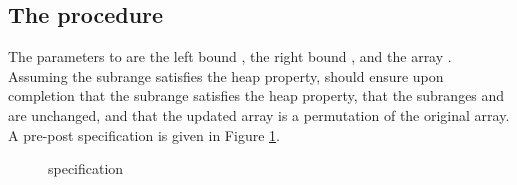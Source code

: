 \documentclass[english,submission]{eptcs}
\newcommand{\procedurelabel}[1]{\small \texttt{#1}}
\newcommand{\situationrule}{\vspace{-1.2ex}\mbox{}\rule[1.2ex]{\linewidth}{0.4pt}\mbox{}}
\newcommand{\procedurerule}{\situationrule}
\newcommand{\invariant}[1]{\small \ensuremath{\mathtt{#1}}}
\newcommand{\declaration}[1]{\small \ensuremath{\mathtt{#1}}}
\newcommand{\ibpid}[1]{\texttt{#1}}
\newcommand{\ibpkw}[1]{\textsf{\textbf{#1}}}
\begin{document}
\subsection{The  procedure}

The parameters to  are the left bound ,
the right bound , and the array . Assuming
the subrange  satisfies the heap property,
 should ensure upon completion that the subrange
 satisfies the heap property, that the
subranges  and 
are unchanged, and that the updated array is a permutation of the
original array. A pre-post specification is given in Figure \ref{fig:Siftdown-spec}.
\begin{figure}
\noindent \begin{centering}
\par\end{centering}

\caption{ specification\label{fig:Siftdown-spec}}
\end{figure}
\end{document}
